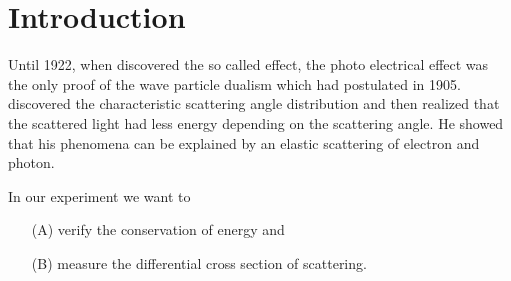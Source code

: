 \section{Introduction}

Until 1922, when  discovered the so called
 effect, the photo electrical effect was the only proof of the wave
particle dualism
which  had postulated in 1905. 
discovered the characteristic scattering angle distribution and then
realized that the scattered
light had less energy depending on the scattering angle. He showed that his
phenomena can be explained by an elastic scattering of electron and photon.


\vspace{1em}\noindent In our experiment we want to
\begin{enumerate}
  \item[(A)] verify the conservation of energy and
  \item[(B)] measure the differential cross section of \compton scattering.
\end{enumerate}
